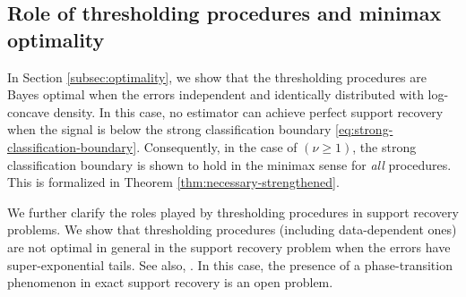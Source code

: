 \subsection{Role of thresholding procedures and minimax optimality}
\label{subsec:role-of-thresholding}
In Section \ref{subsec:optimality}, we show that the thresholding procedures are Bayes optimal when the errors independent and identically distributed with log-concave density. 
In this case, no estimator can achieve perfect support recovery when the signal is below the strong classification boundary \eqref{eq:strong-classification-boundary}.  
Consequently, in the case of $(\nu\ge 1)$, the strong 
classification boundary is shown to hold in the minimax 
sense for \emph{all} procedures. This is formalized in Theorem \ref{thm:necessary-strengthened}. 

We further clarify the roles played by thresholding procedures in support recovery problems.
We show that thresholding procedures (including data-dependent ones) are not optimal in general in the support recovery problem when the errors have super-exponential tails. See also, \citet*{arias2018detection}.
In this case, the presence of a phase-transition phenomenon in exact support recovery is an open problem.  





